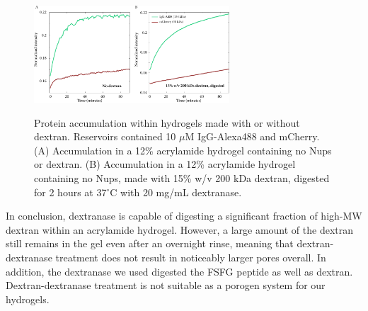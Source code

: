 \begin{figure}
\caption[Protein accumulation within dextran/dextranase hyrogels.]{Protein accumulation within hydrogels made with or without dextran.  Reservoirs contained 10 $\mu$M IgG-Alexa488 and mCherry. (A) Accumulation in a 12\% acrylamide hydrogel containing no Nups or dextran. (B) Accumulation in a 12\% acrylamide hydrogel containing no Nups, made with 15\% w/v 200 kDa dextran, digested for 2 hours at 37$^\circ$C with 20 mg/mL dextranase.}
\centering
\includegraphics[width=0.65\textwidth]{figs/ch03/dxase-results}
\label{fig:dxase-results}
\end{figure} %

In conclusion, dextranase is capable of digesting a significant fraction of high-MW dextran within an acrylamide hydrogel.  However, a large amount of the dextran still remains in the gel even after an overnight rinse, meaning that dextran-dextranase treatment does not result in noticeably larger pores overall.  In addition, the dextranase we used digested the FSFG peptide as well as dextran.  Dextran-dextranase treatment is not suitable as a porogen system for our hydrogels.

